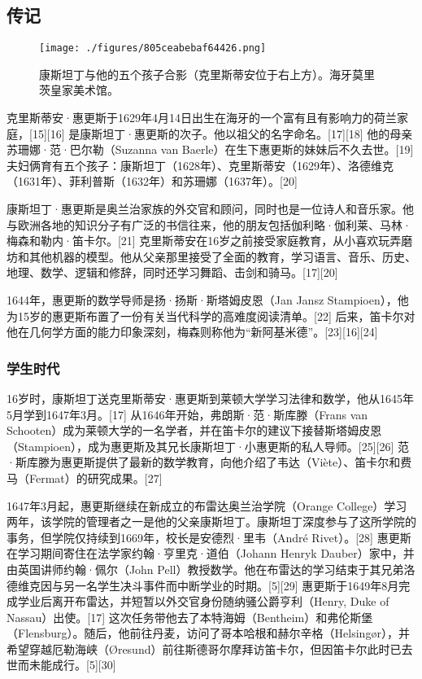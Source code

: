 \subsection{传记}
\begin{figure}[ht]
\centering
\texttt{[image: ./figures/805ceabebaf64426.png]}
\caption{康斯坦丁与他的五个孩子合影（克里斯蒂安位于右上方）。海牙莫里茨皇家美术馆。} \label{fig_HGS_2}
\end{figure}
克里斯蒂安·惠更斯于1629年4月14日出生在海牙的一个富有且有影响力的荷兰家庭，[15][16] 是康斯坦丁·惠更斯的次子。他以祖父的名字命名。[17][18] 他的母亲苏珊娜·范·巴尔勒（Suzanna van Baerle）在生下惠更斯的妹妹后不久去世。[19] 夫妇俩育有五个孩子：康斯坦丁（1628年）、克里斯蒂安（1629年）、洛德维克（1631年）、菲利普斯（1632年）和苏珊娜（1637年）。[20]

康斯坦丁·惠更斯是奥兰治家族的外交官和顾问，同时也是一位诗人和音乐家。他与欧洲各地的知识分子有广泛的书信往来，他的朋友包括伽利略·伽利莱、马林·梅森和勒内·笛卡尔。[21] 克里斯蒂安在16岁之前接受家庭教育，从小喜欢玩弄磨坊和其他机器的模型。他从父亲那里接受了全面的教育，学习语言、音乐、历史、地理、数学、逻辑和修辞，同时还学习舞蹈、击剑和骑马。[17][20]

1644年，惠更斯的数学导师是扬·扬斯·斯塔姆皮恩（Jan Jansz Stampioen），他为15岁的惠更斯布置了一份有关当代科学的高难度阅读清单。[22] 后来，笛卡尔对他在几何学方面的能力印象深刻，梅森则称他为“新阿基米德”。[23][16][24]
\subsubsection{学生时代}
16岁时，康斯坦丁送克里斯蒂安·惠更斯到莱顿大学学习法律和数学，他从1645年5月学到1647年3月。[17] 从1646年开始，弗朗斯·范·斯库滕（Frans van Schooten）成为莱顿大学的一名学者，并在笛卡尔的建议下接替斯塔姆皮恩（Stampioen），成为惠更斯及其兄长康斯坦丁·小惠更斯的私人导师。[25][26] 范·斯库滕为惠更斯提供了最新的数学教育，向他介绍了韦达（Viète）、笛卡尔和费马（Fermat）的研究成果。[27]

1647年3月起，惠更斯继续在新成立的布雷达奥兰治学院（Orange College）学习两年，该学院的管理者之一是他的父亲康斯坦丁。康斯坦丁深度参与了这所学院的事务，但学院仅持续到1669年，校长是安德烈·里韦（André Rivet）。[28] 惠更斯在学习期间寄住在法学家约翰·亨里克·道伯（Johann Henryk Dauber）家中，并由英国讲师约翰·佩尔（John Pell）教授数学。他在布雷达的学习结束于其兄弟洛德维克因与另一名学生决斗事件而中断学业的时期。[5][29] 惠更斯于1649年8月完成学业后离开布雷达，并短暂以外交官身份随纳骚公爵亨利（Henry, Duke of Nassau）出使。[17] 这次任务带他去了本特海姆（Bentheim）和弗伦斯堡（Flensburg）。随后，他前往丹麦，访问了哥本哈根和赫尔辛格（Helsingør），并希望穿越厄勒海峡（Øresund）前往斯德哥尔摩拜访笛卡尔，但因笛卡尔此时已去世而未能成行。[5][30]

